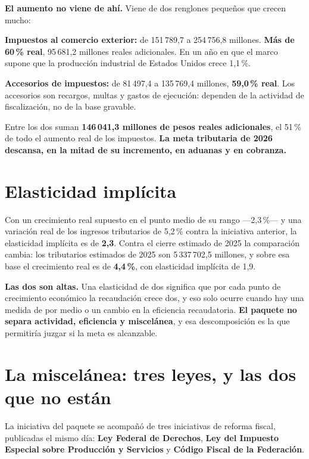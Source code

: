 \textbf{El aumento no viene de ahí.} Viene de dos renglones pequeños que crecen mucho:

\begin{list}{}{\setlength{\leftmargin}{1.4em}\setlength{\itemsep}{2pt}}
\item[$\bullet$] \textbf{Impuestos al comercio exterior:} de 151\,789,7 a 254\,756,8 millones.
\textbf{Más de 60\,\% real}, 95\,681,2 millones reales adicionales. En un año en que el marco
supone que la producción industrial de Estados Unidos crece 1,1\,\%.
\item[$\bullet$] \textbf{Accesorios de impuestos:} de 81\,497,4 a 135\,769,4 millones,
\textbf{59,0\,\% real}. Los accesorios son recargos, multas y gastos de ejecución: dependen de
la actividad de fiscalización, no de la base gravable.
\end{list}

Entre los dos suman \textbf{146\,041,3 millones de pesos reales adicionales}, el 51\,\% de
todo el aumento real de los impuestos. \textbf{La meta tributaria de 2026 descansa, en la
mitad de su incremento, en aduanas y en cobranza.}

\section{Elasticidad implícita}

Con un crecimiento real supuesto en el punto medio de su rango ---2,3\,\%--- y una variación
real de los ingresos tributarios de 5,2\,\% contra la iniciativa anterior, la elasticidad
implícita es de \textbf{2,3}. Contra el cierre estimado de 2025 la comparación cambia: los
tributarios estimados de 2025 son 5\,337\,702,5 millones, y sobre esa base el crecimiento real
es de \textbf{4,4\,\%}, con elasticidad implícita de 1,9.

\textbf{Las dos son altas.} Una elasticidad de dos significa que por cada punto de crecimiento
económico la recaudación crece dos, y eso solo ocurre cuando hay una medida de por medio o un
cambio en la eficiencia recaudatoria. \textbf{El paquete no separa actividad, eficiencia y
miscelánea}, y esa descomposición es la que permitiría juzgar si la meta es alcanzable.

\section{La miscelánea: tres leyes, y las dos que no están}

La iniciativa del paquete se acompañó de tres iniciativas de reforma fiscal, publicadas el
mismo día: \textbf{Ley Federal de Derechos}, \textbf{Ley del Impuesto Especial sobre
Producción y Servicios} y \textbf{Código Fiscal de la Federación}.

